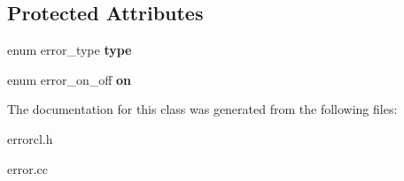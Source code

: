 \subsection*{Protected Attributes}
\begin{DoxyCompactItemize}
\item 
\hypertarget{classcl__error__class_ad3b9534254fe8c25604bc204b6f71c8c}{
enum error\_\-type {\bfseries type}}
\label{classcl__error__class_ad3b9534254fe8c25604bc204b6f71c8c}

\item 
\hypertarget{classcl__error__class_a546d6f340248ee3b04b81b6b66e689ea}{
enum error\_\-on\_\-off {\bfseries on}}
\label{classcl__error__class_a546d6f340248ee3b04b81b6b66e689ea}

\end{DoxyCompactItemize}


The documentation for this class was generated from the following files:\begin{DoxyCompactItemize}
\item 
errorcl.h\item 
error.cc\end{DoxyCompactItemize}
